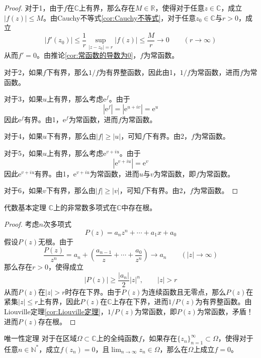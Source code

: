 \documentclass[lang = cn, scheme = chinese, thmcnt = section]{elegantbook}
\newcommand{\N}{\mathbb{N}}            %
\newcommand{\R}{\mathbb{R}}            %
\newcommand{\C}{\mathbb{C}}  		   %
\newcommand{\sub}{\subset}             %
\newcommand{\ee}{\mathrm{e}^}           %
\begin{document}
\begin{proof}
	对于1，由于$f$在$\C$上有界，那么存在$M\in\R$，使得对于任意$z\in\C$，成立$|f(z)| \le M$。由Cauchy不等式\ref{cor:Cauchy不等式}，对于任意$z_0\in\C$与$r>0$，成立
	$$
	|f'(z_0)| \le \frac{1}{r}\sup_{|z-z_0|=r}|f(z)|
	\le\frac{M}{r}\to 0\qquad (r\to \infty)
	$$
	从而$f'=0$。由推论\ref{cor:常函数的导数为0}，$f$为常函数。
	
	对于2，如果$f$下有界，那么$1/f$为有界整函数，因此由1，$1/f$为常函数，进而$f$为常函数。
	
	对于3，如果$u$上有界，那么考虑$\ee{f}$。由于
	$$
	|\ee{f}|=|\ee{u+iv}|=\ee{u}
	$$
	因此$\ee{f}$有界。由1，$\ee{f}$为常函数，进而$f$为常函数。
	
	对于4，如果$u$下有界，那么由$|f|\ge |u|$，可知$f$下有界。由2，$f$为常函数。
	
	对于5，如果$u$上有界，那么考虑$\ee{v+iu}$。由于
	$$
	|\ee{v+iu}|=\ee{v}
	$$
	因此$\ee{v+iu}$有界。由1，$\ee{v+iu}$为常函数，进而$u$与$v$为常函数，即$f$为常函数。
	
	对于6，如果$v$下有界，那么由$|f|\ge |v|$，可知$f$下有界。由2，$f$为常函数。
\end{proof}

\begin{corollary}{代数基本定理}
	$\C$上的非常数多项式在$\C$中存在根。
\end{corollary}

\begin{proof}
	考虑$n$次多项式%
	$$
	P(z)=a_nz^n+\cdots +a_1x+a_0
	$$
	假设$P(z)$无根。由于%
	$$
	\frac{P(z)}{z^n}=a_n+\left(\frac{a_{n-1}}{z}+\cdots+\frac{a_0}{z^n}\right)\to a_n
	\qquad (|z|\to\infty)
	$$
	那么存在$r>0$，使得成立
	$$
	|P(z)|\ge\frac{|a_n|}{2}|z|^n,\qquad |z|>r
	$$
	从而$P(z)$在$|z|>r$时存在下界。由于$P(z)$为连续函数且无零点，那么$P(z)$在紧集$|z|\le r$上有界，因此$P(z)$在$\C$上存在下界，进而$1/P(z)$为有界整函数。由Liouville定理\ref{cor:Liouville定理}，$1/P(z)$为常函数，即$P(z)$为常函数，矛盾！进而$P(z)$存在根。
\end{proof}

\begin{theorem}{唯一性定理}
	对于在区域$\Omega\sub\C$上的全纯函数$f$，如果存在$\{z_n\}_{n=1}^{\infty}\sub\Omega$，使得对于任意$n\in\N^*$，成立$f(z_n)=0$，且$\displaystyle\lim_{n\to\infty}{z_n}\in\Omega$，那么在$\Omega$上成立$f=0$。
\end{theorem}
\end{document}
